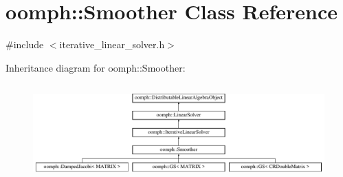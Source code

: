 \hypertarget{classoomph_1_1Smoother}{}\section{oomph\+:\+:Smoother Class Reference}
\label{classoomph_1_1Smoother}


{\ttfamily \#include $<$iterative\+\_\+linear\+\_\+solver.\+h$>$}

Inheritance diagram for oomph\+:\+:Smoother\+:\begin{figure}[H]
\begin{center}
\leavevmode
\includegraphics[height=3.718459cm]{classoomph_1_1Smoother}
\end{center}
\end{figure}
